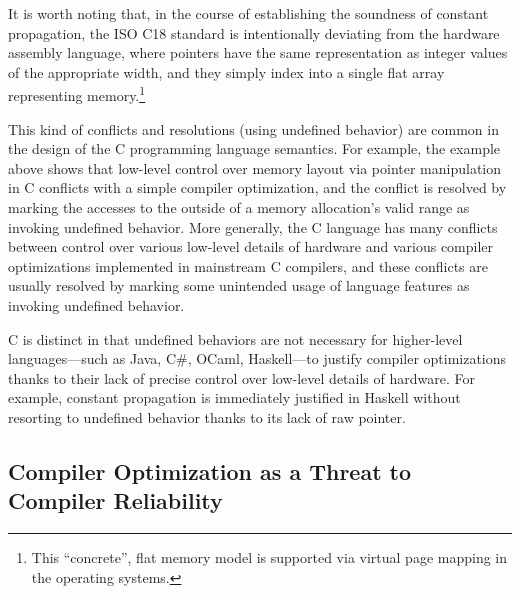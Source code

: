 It is worth noting that, in the course of establishing the soundness of constant propagation, the
ISO C18 standard is intentionally deviating from the hardware assembly language, where pointers have
the same representation as integer values of the appropriate width, and they simply index into a
single flat array representing memory.\footnote{This ``concrete'', flat memory model is supported
  via virtual page mapping in the operating systems.}


This kind of conflicts and resolutions (using undefined behavior) are common in the design of the C
programming language semantics.  For example, the example above shows that low-level control over
memory layout via pointer manipulation in C conflicts with a simple compiler optimization, and the
conflict is resolved by marking the accesses to the outside of a memory allocation's valid range as
invoking undefined behavior.  More generally, the C language has many conflicts between control over
various low-level details of hardware and various compiler optimizations implemented in mainstream C
compilers, and these conflicts are usually resolved by marking some unintended usage of language
features as invoking undefined behavior.

C is distinct in that undefined behaviors are not necessary for higher-level languages---such as
Java, C\#, OCaml, Haskell---to justify compiler optimizations thanks to their lack of precise
control over low-level details of hardware.  For example, constant propagation is immediately
justified in Haskell without resorting to undefined behavior thanks to its lack of raw pointer.




\subsection{Compiler Optimization as a Threat to Compiler Reliability}
\label{sec:introduction:problem}

